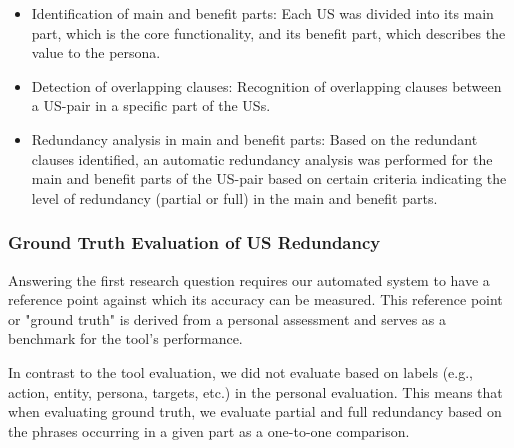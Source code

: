 \begin{itemize}
	
	\item Identification of main and benefit parts: Each US was divided into its main part, which is the core functionality, and its benefit part, which describes the value to the persona.
	
	\item Detection of overlapping clauses: Recognition of overlapping clauses between a US-pair in a specific part of the USs.
	
	\item Redundancy analysis in main and benefit parts: Based on the redundant clauses identified, an automatic redundancy analysis was performed for the main and benefit parts of the US-pair based on certain criteria indicating the level of redundancy (partial or full) in the main and benefit parts.
		
\end{itemize}
\subsubsection*{Ground Truth Evaluation of US Redundancy}
Answering the first research question requires our automated system to have a reference point against which its accuracy can be measured. This reference point or "ground truth" is derived from a personal assessment and serves as a benchmark for the tool's performance.

In contrast to the tool evaluation, we did not evaluate based on labels (e.g., action, entity, persona, targets, etc.) in the personal evaluation. This means that when evaluating ground truth, we evaluate partial and full redundancy based on the phrases occurring in a given part as a one-to-one comparison.


